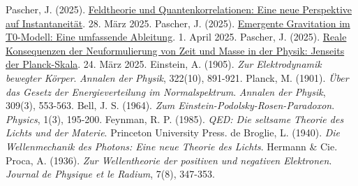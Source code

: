 \documentclass[12pt,a4paper]{article}
\begin{document}
\begin{thebibliography}{99}
		 Pascher, J. (2025). \href{https://github.com/jpascher/T0-Time-Mass-Duality/tree/main/2/pdf/Deutsch/FeldtheorieQuanten.pdf}{Feldtheorie und Quantenkorrelationen: Eine neue Perspektive auf Instantaneität}. 28. März 2025.
		 Pascher, J. (2025). \href{https://github.com/jpascher/T0-Time-Mass-Duality/tree/main/2/pdf/Deutsch/EmergentGravT0.pdf}{Emergente Gravitation im T0-Modell: Eine umfassende Ableitung}. 1. April 2025.
		 Pascher, J. (2025). \href{https://github.com/jpascher/T0-Time-Mass-Duality/tree/main/2/pdf/Deutsch/JenseitsPlanck.pdf}{Reale Konsequenzen der Neuformulierung von Zeit und Masse in der Physik: Jenseits der Planck-Skala}. 24. März 2025.
		 Einstein, A. (1905). \textit{Zur Elektrodynamik bewegter Körper}. \textit{Annalen der Physik}, 322(10), 891-921.
		 Planck, M. (1901). \textit{Über das Gesetz der Energieverteilung im Normalspektrum}. \textit{Annalen der Physik}, 309(3), 553-563.
		 Bell, J. S. (1964). \textit{Zum Einstein-Podolsky-Rosen-Paradoxon}. \textit{Physics}, 1(3), 195-200.
		 Feynman, R. P. (1985). \textit{QED: Die seltsame Theorie des Lichts und der Materie}. Princeton University Press.
		 de Broglie, L. (1940). \textit{Die Wellenmechanik des Photons: Eine neue Theorie des Lichts}. Hermann \& Cie.
		 Proca, A. (1936). \textit{Zur Wellentheorie der positiven und negativen Elektronen}. \textit{Journal de Physique et le Radium}, 7(8), 347-353.
	\end{thebibliography}
	
\end{document}
